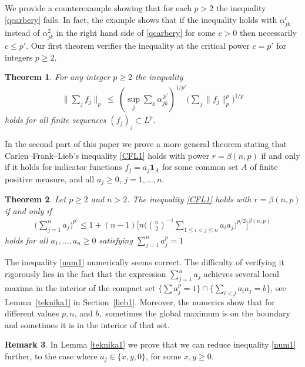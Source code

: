 \documentclass[11pt]{article}
\newtheorem{theorem}{Theorem}[section]
\theoremstyle{definition}
\newtheorem{remark}[theorem]{Remark}
\newcommand{\1}{\mathbf{1}}
\begin{document}
We provide a counterexample showing that for each $p>2$  the inequality \eqref{qcarbery} fails. In fact, the example shows that if the inequality holds with $\alpha_{jk}^{c}$ instead of $\alpha_{jk}^{2}$ in the right hand side of \eqref{qcarbery}  for some $c>0$ then necessarily $c \leq p'$. Our first theorem verifies the inequality at the critical power $c=p'$ for integers $p\geq 2$. 
\begin{theorem}\label{jose}
For any integer $p\geq 2$ the inequality 
\begin{align}\label{carbery0}
\Big\|\sum_j f_j\Big\|_p \ \le\  \left(\sup_{j} \sum_{k} \alpha_{jk}^{\,p'}\right)^{1/p'} \Big(\sum_j \|f_j\|_p^p\Big)^{1/p}
\end{align}
holds for all finite sequences $(f_{j})_{j}\subset L^{p}$. 
\end{theorem}
    
In the second part of this paper we prove a more general theorem stating that Carlen--Frank--Lieb's inequality \eqref{CFL1} holds with power $r = \beta(n,p)$ if and only if it holds for indicator functions $f_{j}=a_{j} \mathbf{1}_{A}$ for some common set $A$ of finite positive measure, and all $a_{j}\geq 0$, $j=1, \ldots, n$. 
\begin{theorem}\label{absnon}
Let $p\geq 2$ and $n>2$.  The inequality \eqref{CFL1} holds with $r=\beta(n,p)$ if and only if 
\begin{align}\label{num1}
    \Big(\sum_{j=1}^{n}a_{j} \Big)^{p'}\leq 1+(n-1)\Bigg[ n\Big(\binom{n}{2}^{-1}\sum_{1\leq i<j\leq n} a_{i}a_{j}\Big)^{p/2}\Bigg]^{\beta(n,p)} 
\end{align}
holds for all $a_{1}, \ldots, a_{n}\geq 0$ satisfying  $\sum_{j=1}^{n}a_{j}^{p}=1$
\end{theorem}
The inequality \eqref{num1} numerically seems correct. The difficulty of verifying it rigorously lies in the fact that the expression $\sum_{j=1}^{n}a_{j}$ achieves several local maxima in the interior of the compact set $\{\sum a_{j}^{p}=1\}\cap \{\sum_{i<j}a_{i}a_{j}=b\}$, see Lemma~\ref{teknika1} in Section~\ref{lieb1}. Moreover, the numerics show that for different values $p, n$, and $b,$ sometimes the global maximum is on the boundary and sometimes it is in the interior of that set.  

\begin{remark}
In Lemma \ref{teknika1} we prove that we can reduce inequality \eqref{num1} further, to the case where $a_j\in\{x,y,0\}$, for some $x,y\geq0$.   
\end{remark}
\end{document}
